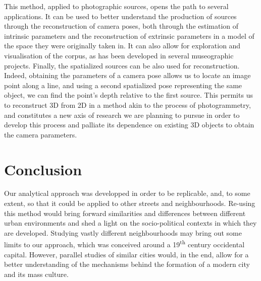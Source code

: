 \documentclass[12pt, a4paper, twocolumn]{article}
\begin{document}
This method, applied to photographic sources, opens the path to several applications. It can be used to better understand the production of sources through the reconstruction of camera poses, both through the estimation of intrinsic parameters and the reconstruction of extrinsic parameters in a model of the space they were originally taken in. It can also allow for exploration and visualisation of the corpus, as has been developed in several museographic projects. Finally, the spatialized sources can be also used for reconstruction. Indeed, obtaining the parameters of a camera pose allows us to locate an image point along a line, and using a second spatialized pose representing the same object, we can find the point's depth relative to the first source. This permits us to reconstruct 3D from 2D in a method akin to the process of photogrammetry, and constitutes a new axis of research we are planning to pursue in order to develop this process and palliate its dependence on existing 3D objects to obtain the camera parameters.

\section{Conclusion}

Our analytical approach was developped in order to be replicable, and, to some extent, so that it could be applied to other streets and neighbourhoods. Re-using this method would bring forward similarities and differences between different urban environments and shed a light on the socio-political contexts in which they are developed. Studying vastly different neighbourhoods may bring out some limits to our approach, which was conceived around a 19\textsuperscript{th} century occidental capital. However, parallel studies of similar cities would, in the end, allow for a better understanding of the mechanisms behind the formation of a modern city and its mass culture.

\printbibliography
\clearpage
\end{document}
